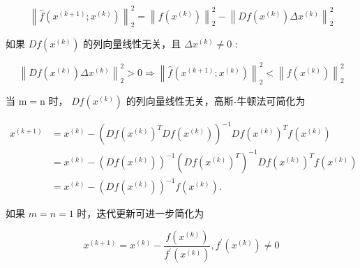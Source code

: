 $$ \left\|\hat{f}\left(x^{(k+1)} ; x^{(k)}\right)\right\|_{2}^{2}=\left\|f\left(x^{(k)}\right)\right\|_{2}^{2}-\left\|D f\left(x^{(k)}\right) \Delta x^{(k)}\right\|_{2}^{2} $$

如果 $ D f\left(x^{(k)}\right) $ 的列向量线性无关，且 $ \Delta x^{(k)} \neq 0 $ :

$$ \left\|D f\left(x^{(k)}\right) \Delta x^{(k)}\right\|_{2}^{2}>0 \Rightarrow\left\|\hat{f}\left(x^{(k+1)} ; x^{(k)}\right)\right\|_{2}^{2}<\left\|f\left(x^{(k)}\right)\right\|_{2}^{2} $$

当 $ \mathrm{m}=\mathrm{n} $ 时， $ D f\left(x^{(k)}\right) $ 的列向量线性无关，高斯-牛顿法可简化为

$$
\begin{aligned}
x^{(k+1)} &=x^{(k)}-\left(D f\left(x^{(k)}\right)^{T} D f\left(x^{(k)}\right)\right)^{-1} D f\left(x^{(k)}\right)^{T} f\left(x^{(k)}\right) \\
&=x^{(k)}-\left(D f\left(x^{(k)}\right)\right)^{-1}\left(D f\left(x^{(k)}\right)^{T}\right)^{-1} D f\left(x^{(k)}\right)^{T} f\left(x^{(k)}\right) \\
&=x^{(k)}-\left(D f\left(x^{(k)}\right)\right)^{-1} f\left(x^{(k)}\right) .
\end{aligned}
$$


如果 $ m=n=1 $ 时，迭代更新可进一步简化为

$$ x^{(k+1)}=x^{(k)}-\frac{f\left(x^{(k)}\right)}{f^{\prime}\left(x^{(k)}\right)}, f^{\prime}\left(x^{(k)}\right) \neq 0 $$

